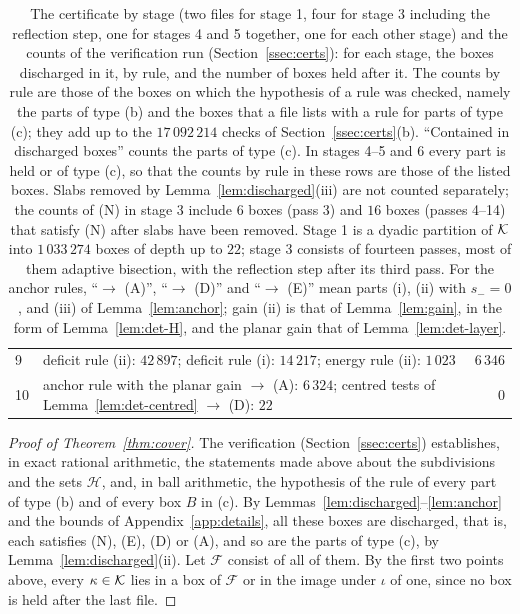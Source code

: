 \begin{table}[h]
\begin{tabular}{l>{\raggedright\arraybackslash}p{}r}
9 & deficit rule (ii): $42\,897$; deficit rule (i): $14\,217$; energy rule (ii): $1\,023$ & $6\,346$\\
10 & anchor rule with the planar gain $\to$ (A): $6\,324$; centred tests of Lemma~\ref{lem:det-centred} $\to$ (D): $22$ & $0$\\
\bottomrule
\end{tabular}
\caption{The certificate by stage (two files for stage 1, four for stage 3 including the reflection step, one for stages 4 and 5
together, one for each other stage) and the counts of the verification run (Section~\ref{ssec:certs}): for each stage, the boxes
discharged in it, by rule, and the number of boxes held after it. The counts by rule are those of the boxes on which the hypothesis
of a rule was checked, namely the parts of type (b) and the boxes that a file lists with a rule for parts of type (c); they add up
to the $17\,092\,214$ checks of Section~\ref{ssec:certs}(b). ``Contained in discharged boxes'' counts the parts of type (c). In
stages 4--5 and 6 every part is held or of type (c), so that the counts by rule in these rows are those of the listed boxes. Slabs
removed by Lemma~\ref{lem:discharged}(iii) are not counted separately; the counts of (N) in stage 3 include $6$ boxes (pass 3) and
$16$ boxes (passes 4--14) that satisfy (N) after slabs have been removed. Stage 1 is a dyadic partition of $\mathcal K$ into $1\,033\,274$
boxes of depth up to $22$; stage 3 consists of fourteen passes, most of them adaptive bisection, with the reflection step after
its third pass. For the anchor rules, ``$\to$ (A)'', ``$\to$ (D)'' and ``$\to$ (E)'' mean parts (i), (ii) with $s_-=0$, and
(iii) of Lemma~\ref{lem:anchor}; gain (ii) is that of Lemma~\ref{lem:gain}, in the form of Lemma~\ref{lem:det-H}, and the planar
gain that of Lemma~\ref{lem:det-layer}.}\label{tab:stages}
\end{table}

\begin{proof}[Proof of Theorem~\ref{thm:cover}]
The verification (Section~\ref{ssec:certs}) establishes, in exact rational arithmetic, the statements made above about
the subdivisions and the sets $\mathcal H$, and, in ball arithmetic, the hypothesis of the rule of every part of type
(b) and of every box $B$ in (c). By Lemmas~\ref{lem:discharged}--\ref{lem:anchor} and the bounds of
Appendix~\ref{app:details}, all these boxes are discharged, that is, each satisfies (N), (E), (D) or (A), and so are the parts
of type (c), by Lemma~\ref{lem:discharged}(ii). Let $\mathcal F$ consist of all of them. By the first two points above,
every $\kappa\in\mathcal K$ lies in a box of $\mathcal F$ or in the image under $\iota$ of one, since no box is held after the last
file.
\end{proof}

